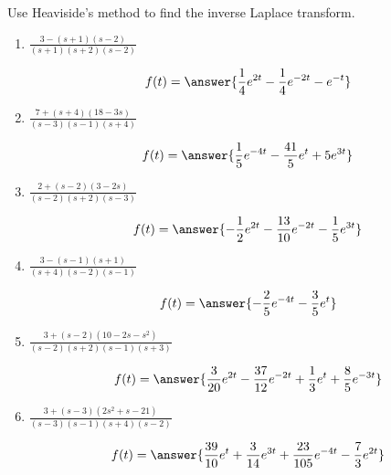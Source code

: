 \documentclass{ximera}
\begin{document}
\begin{problem}\label{exer:8.2.3}
 Use Heaviside's method to find the inverse Laplace transform.

\begin{enumerate}
    \item $\frac{3-(s+1)(s-2)}{(s+1)(s+2)(s-2)}$
    
$$f(t)=\answer{\frac{1}{4}e^{2t}-\frac{1}{4}e^{-2t}-e^{-t}}$$

    \item $\frac{7+(s+4)(18-3s)}{(s-3)(s-1)(s+4)}$
    
$$f(t)=\answer{\frac{1}{5}e^{-4t}-\frac{41}{5}e^{t}+5e^{3t}}$$

    \item $\frac{2+(s-2)(3-2s)}{(s-2)(s+2)(s-3)}$
    
$$f(t)=\answer{-\frac{1}{2}e^{2t}-\frac{13}{10}e^{-2t}-\frac{1}{5}e^{3t}}$$

    \item $\frac{3-(s-1)(s+1)}{(s+4)(s-2)(s-1)}$

$$f(t)=\answer{-\frac{2}{5}e^{-4t}-\frac{3}{5}e^{t}}$$

\item $\frac{3+(s-2)(10-2s-s^2)}{(s-2)(s+2)(s-1)(s+3)}$

$$f(t)=\answer{\frac{3}{20}e^{2t}-\frac{37}{12}e^{-2t}+\frac{1}{3}e^{t}+\frac{8}{5}e^{-3t}}$$
    
\item $\frac{3+(s-3)(2s^2+s-21)}{(s-3)(s-1)(s+4)(s-2)}$

$$f(t)=\answer{\frac{39}{10}e^{t}+\frac{3}{14}e^{3t}+\frac{23}{105}e^{-4t}-\frac{7}{3}e^{2t}}$$
\end{enumerate}
\end{problem}
\end{document}
